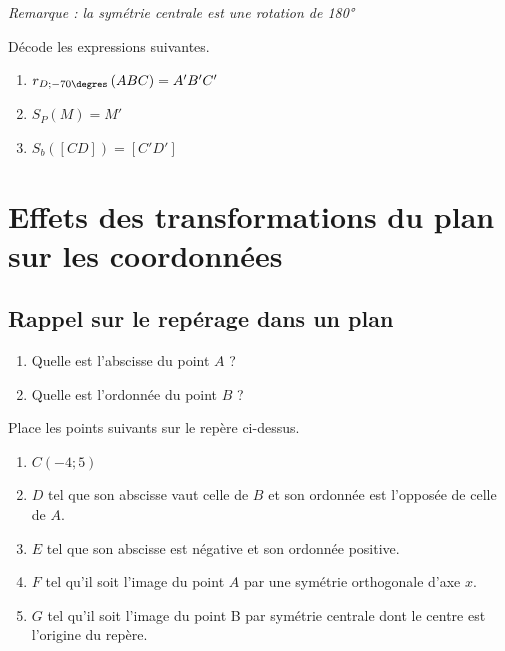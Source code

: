 \documentclass[../../syllabus_2.tex]{subfiles}
\begin{document}
\emph{Remarque : la symétrie centrale est une rotation de \ang{180}}

\begin{exercise}
    Décode les expressions suivantes.
    \begin{enumerate}
        \item \(r_{D;- 70\degres}\left(ABC\right) = A'B'C'\)\bigbreak{}
        \item \(S_{P}(M)=M'\)\bigbreak{}
        \item \(S_{b}([CD])=[C'D']\)\bigbreak{}
    \end{enumerate}
\end{exercise}

\newpage
\section{Effets des transformations du plan sur les coordonnées}
\subsection{Rappel sur le repérage dans un plan}
\begin{center}
    
\end{center}
\begin{exercise}
    \begin{enumerate}
        \item Quelle est l'abscisse du point $A$ ?
        \item Quelle est l'ordonnée du point $B$ ?
    \end{enumerate}
\end{exercise}
\begin{exercise}
    Place les points suivants sur le repère ci-dessus.
    \begin{enumerate}
        \item $C(-4;5)$
        \item $D$ tel que son abscisse vaut celle de $B$ et son ordonnée est l'opposée de celle de $A$.
        \item $E$ tel que son abscisse est négative et son ordonnée positive.
        \item $F$ tel qu'il soit l'image du point $A$ par une symétrie orthogonale d'axe $x$.
        \item $G$ tel qu'il soit l'image du point B par symétrie centrale dont le centre est l'origine du repère.
    \end{enumerate}
\end{exercise}
\end{document}
